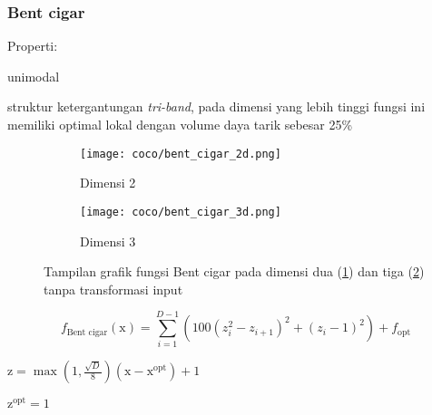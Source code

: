 \subsubsection*{Bent cigar}
\noindent Properti:
\begin{packed_item}
  \item unimodal
  \item struktur ketergantungan \textit{tri-band}, pada dimensi yang lebih tinggi fungsi ini memiliki optimal lokal dengan volume daya tarik sebesar 25\%
\end{packed_item}
\begin{figure}[H]
	\centering
	\begin{subfigure}[b]{0.4\textwidth}
		\centering
		\texttt{[image: coco/bent\_cigar\_2d.png]}
		\caption{Dimensi 2}
		\label{fig:bent-cigar-coco-2d}
	\end{subfigure}
	\hfill
	\begin{subfigure}[b]{0.4\textwidth}
		\centering
		\texttt{[image: coco/bent\_cigar\_3d.png]}
		\caption{Dimensi 3}
		\label{fig:bent-cigar-coco-3d}
	\end{subfigure}
	\caption{Tampilan grafik fungsi Bent cigar pada dimensi dua (\cref{fig:bent-cigar-coco-2d}) dan tiga (\cref{fig:bent-cigar-coco-3d}) tanpa transformasi input}
	\label{fig:bent_cigar_coco}
\end{figure}
\begin{equation}
  f_{\text{Bent cigar}}(\mathrm{x})=\sum_{i=1}^{D-1}(100(z_i^2-z_{i+1})^2+(z_i-1)^2)+f_{\text{opt}}
\end{equation}
\begin{packed_item}
    \item $\mathrm{z}=\max(1,\frac{\sqrt{D}}{8})(\mathrm{x}-\mathrm{x}^{\text{opt}})+1$
    \item $\mathrm{z}^{\text{opt}}=1$
\end{packed_item}

